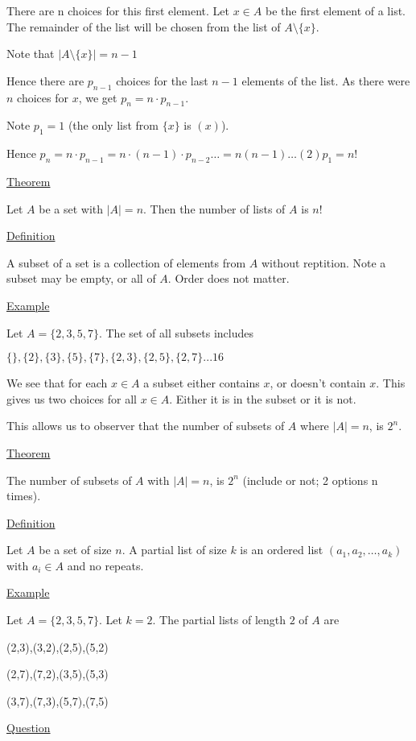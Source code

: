 \documentclass{article}
\begin{document}
There are n choices for this first element. Let $x \in A$ be the first element of a list. The remainder of the list will be chosen from the list of $A \setminus \{x\}$.

Note that $|A \setminus \{x\} | = n - 1$

Hence there are $p_{n-1}$ choices for the last $n-1$ elements of the list. As there were $n$ choices for $x$, we get $p_n = n \cdot p_{n-1}$.

Note $p_1 = 1$ (the only list from $\{x\}$ is $(x)$). 

Hence  $p_n = n \cdot p_{n-1} = n \cdot (n-1) \cdot p_{n-2} \ldots = n(n-1) \ldots (2)p_1 = n!$

\underline{Theorem} 

Let $A$ be a set with $|A| = n$. Then the number of lists of $A$ is $n!$

\underline{Definition}

A subset of a set is a collection of elements from $A$ without reptition. Note a subset may be empty, or all of $A$. Order does not matter.

\underline{Example} 

Let $A = \{2,3,5,7\}$. The set of all subsets includes

$\{\}, \{2\}, \{3\}, \{5\}, \{7\}, \{2,3\}, \{2,5\}, \{2,7\}... 16$

We see that for each $x \in A$ a subset either contains $x$, or doesn't contain $x$. This gives us two choices for all $x \in A$. Either it is in the subset or it is not. 

This allows us to observer that the number of subsets of $A$ where $|A| = n$, is $2^n$. 

\underline{Theorem}

The number of subsets of $A$ with $|A| = n$, is $2^n$ (include or not; 2 options n times). 

\underline{Definition}

Let $A$ be a set of size $n$. A partial list of size $k$ is an ordered list $(a_1, a_2, \ldots, a_k)$ with $a_i \in A$ and no repeats. 

\underline{Example}

Let $A = \{2,3,5,7\}$. Let $k = 2$. The partial lists of length $2$ of $A$ are

(2,3),(3,2),(2,5),(5,2)

(2,7),(7,2),(3,5),(5,3)

(3,7),(7,3),(5,7),(7,5)

\underline{Question}
\end{document}
